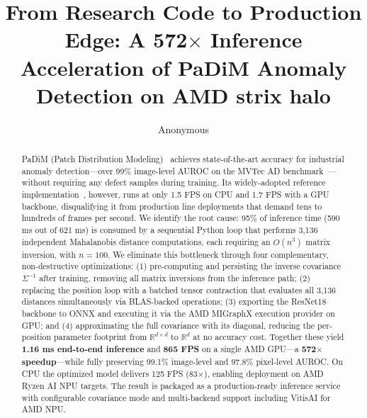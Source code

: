 \documentclass[blind]{gtac}
\title{From Research Code to Production Edge: A 572$\times$ Inference
Acceleration of PaDiM Anomaly Detection on AMD strix halo}
\author{Anonymous}
\begin{document}
\maketitle

\pagestyle{fancy}
\fancyhf{}
\cfoot{\thepage}
\renewcommand{\headrulewidth}{0pt}
\thispagestyle{fancy}

\begin{abstract}
PaDiM (Patch Distribution Modeling)~\cite{defard2021padim} achieves
state-of-the-art accuracy for industrial anomaly detection---over 99\%
image-level AUROC on the MVTec AD benchmark~\cite{bergmann2019mvtec,bergmann2021mvtec}---without
requiring any defect samples during training.  Its widely-adopted reference
implementation~\cite{padim_repo}, however, runs at only 1.5 FPS on CPU and
1.7 FPS with a GPU backbone, disqualifying it from production line deployments
that demand tens to hundreds of frames per second.  We identify the root cause:
95\% of inference time (590 ms out of 621 ms) is consumed by a sequential
Python loop that performs 3{,}136 independent Mahalanobis distance computations,
each requiring an $O(n^3)$ matrix inversion, with $n\!=\!100$.  We
eliminate this bottleneck through four complementary, non-destructive
optimizations: (1) pre-computing and persisting the inverse covariance
$\Sigma^{-1}$ after training, removing all matrix inversions from the inference
path; (2) replacing the position loop with a batched tensor contraction that
evaluates all 3{,}136 distances simultaneously via BLAS-backed operations;
(3) exporting the ResNet18 backbone to ONNX and executing it via the AMD
MIGraphX execution provider on GPU; and (4) approximating the full covariance
with its diagonal, reducing the per-position parameter footprint from
$\mathbb{R}^{d\times d}$ to $\mathbb{R}^{d}$ at no accuracy cost.
Together these yield \textbf{1.16 ms end-to-end inference} and \textbf{865 FPS}
on a single AMD GPU---a \textbf{572$\times$ speedup}---while fully preserving
99.1\% image-level and 97.8\% pixel-level AUROC.  On CPU the optimized model
delivers 125 FPS (83$\times$), enabling deployment on AMD Ryzen AI NPU targets.
The result is packaged as a production-ready inference service with configurable
covariance mode and multi-backend support including VitisAI for AMD NPU.
\end{abstract}

\end{document}
